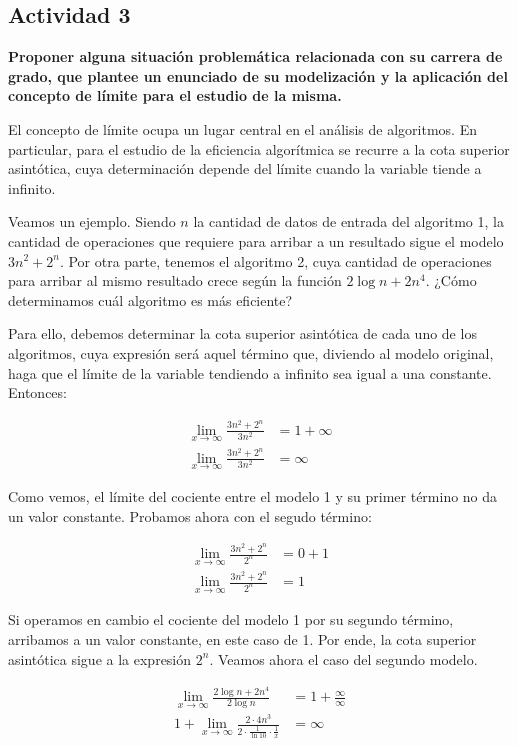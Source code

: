 \subsection*{Actividad 3}

\textbf{Proponer alguna situación problemática relacionada con su carrera
    de grado, que plantee un enunciado de su modelización y la
    aplicación del concepto de límite para el estudio de la misma.}

El concepto de límite ocupa un lugar central en el análisis de algoritmos.
En particular, para el estudio de la eficiencia algorítmica se recurre a la cota superior asintótica,
cuya determinación depende del límite cuando la variable tiende a infinito.

Veamos un ejemplo. Siendo $n$ la cantidad de datos de entrada del algoritmo 1, la cantidad de operaciones que requiere
para arribar a un resultado sigue el modelo $3n^2 + 2^n$. Por otra parte, tenemos el algoritmo 2, cuya cantidad de operaciones
para arribar al mismo resultado crece según la función $2 \log n + 2n^4$. ¿Cómo determinamos cuál algoritmo es más eficiente?

Para ello, debemos determinar la cota superior asintótica de cada uno de los algoritmos, cuya expresión será aquel término que, diviendo
al modelo original, haga que el límite de la variable tendiendo a infinito sea igual a una constante. Entonces:

\begin{align*}
    \lim_{x \to \infty} \frac{3n^2 + 2^n}{3n^2} & = 1 + \infty \\
    \lim_{x \to \infty} \frac{3n^2 + 2^n}{3n^2} & = \infty
\end{align*}

Como vemos, el límite del cociente entre el modelo 1 y su primer término no da un valor constante. Probamos ahora con el segudo término:

\begin{align*}
    \lim_{x \to \infty} \frac{3n^2 + 2^n}{2^n} & = 0 + 1 \\
    \lim_{x \to \infty} \frac{3n^2 + 2^n}{2^n} & = 1
\end{align*}

Si operamos en cambio el cociente del modelo 1 por su segundo término, arribamos a un valor constante, en este caso de 1. Por ende,
la cota superior asintótica sigue a la expresión $2^n$. Veamos ahora el caso del segundo modelo.

\begin{align*}
    \lim_{x \to \infty} \frac{2 \log n + 2n^4}{2 \log n }                                   & = 1 + \frac{\infty}{\infty} \\
    1 + \lim_{x \to \infty} \frac{2 \cdot 4n^3}{2 \cdot \frac{1}{\ln 10} \cdot \frac{1}{x}} & = \infty
\end{align*}

